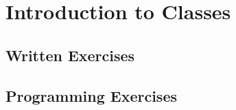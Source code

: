 \section{Introduction to Classes}

\subsection{Written Exercises}

\subsection{Programming Exercises}